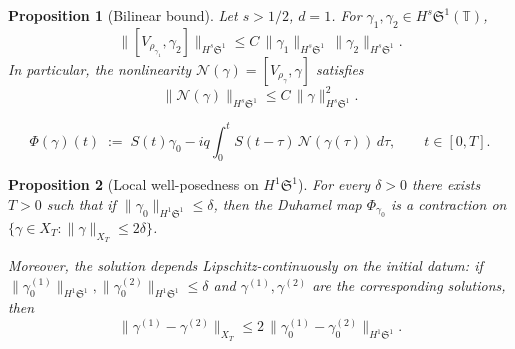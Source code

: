 \documentclass[10pt,a4paper]{amsart}
\newtheorem{proposition}{Proposition}
\newcommand{\Sp}{\mathfrak{S}}
\newcommand{\T}{\mathbb{T}}
\begin{document}
\begin{proposition}[Bilinear bound]
\label{prop:bilinear}
Let $s>1/2$, $d=1$. For $\gamma_1,\gamma_2\in H^s\Sp^1(\T)$,
\begin{equation}\label{eq:bilinear}
  \|[V_{\rho_{\gamma_1}},\gamma_2]\|_{H^s\Sp^1}
  \le C\,\|\gamma_1\|_{H^s\Sp^1}
  \,\|\gamma_2\|_{H^s\Sp^1}.
\end{equation}
In particular, the nonlinearity $\mathcal{N}(\gamma)=[V_{\rho_\gamma},\gamma]$ satisfies
\begin{equation}\label{eq:nonlin_bound}
  \|\mathcal{N}(\gamma)\|_{H^s\Sp^1}
  \le C\,\|\gamma\|_{H^s\Sp^1}^2.
\end{equation}
\end{proposition}

\begin{equation}\label{eq:Duhamel_map}
  \Phi(\gamma)(t) \;:=\; S(t)\gamma_0
  - iq\int_0^t S(t-\tau)\,\mathcal{N}(\gamma(\tau))\,d\tau,
  \qquad t\in[0,T].
\end{equation}

\begin{proposition}[Local well-posedness on $H^1\Sp^1$]
\label{prop:local}
For every $\delta>0$ there exists $T>0$ such that if $\|\gamma_0\|_{H^1\Sp^1}\le\delta$, then the Duhamel map $\Phi_{\gamma_0}$ is a contraction on $\bigl\{\gamma\in X_T : \|\gamma\|_{X_T}\le 2\delta\bigr\}$.

Moreover, the solution depends Lipschitz-continuously on the initial datum: if $\|\gamma_0^{(1)}\|_{H^1\Sp^1}, \|\gamma_0^{(2)}\|_{H^1\Sp^1}\le\delta$ and $\gamma^{(1)},\gamma^{(2)}$ are the corresponding solutions, then
\begin{equation}\label{eq:lwp_stab}
  \|\gamma^{(1)}-\gamma^{(2)}\|_{X_T}
  \le 2\,\|\gamma_0^{(1)}-\gamma_0^{(2)}\|_{H^1\Sp^1}.
\end{equation}
\end{proposition}
\end{document}
